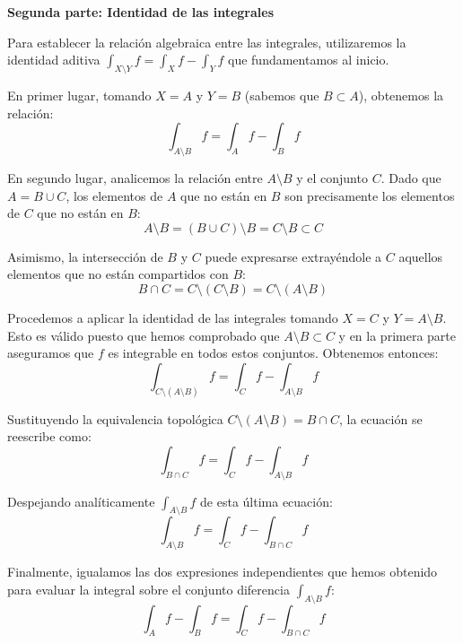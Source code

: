 \documentclass[11pt,letterpaper]{article}
\begin{document}
\vspace{0.5cm}
\textbf{Segunda parte: Identidad de las integrales}

Para establecer la relación algebraica entre las integrales, utilizaremos la identidad aditiva $\int_{X \setminus Y} f = \int_X f - \int_Y f$ que fundamentamos al inicio.

En primer lugar, tomando $X = A$ y $Y = B$ (sabemos que $B \subset A$), obtenemos la relación:
\begin{equation*}
\int_{A \setminus B} f = \int_A f - \int_B f
\end{equation*}

En segundo lugar, analicemos la relación entre $A \setminus B$ y el conjunto $C$. Dado que $A = B \cup C$, los elementos de $A$ que no están en $B$ son precisamente los elementos de $C$ que no están en $B$:
\begin{equation*}
A \setminus B = (B \cup C) \setminus B = C \setminus B \subset C
\end{equation*}

Asimismo, la intersección de $B$ y $C$ puede expresarse extrayéndole a $C$ aquellos elementos que no están compartidos con $B$:
\begin{equation*}
B \cap C = C \setminus (C \setminus B) = C \setminus (A \setminus B)
\end{equation*}

Procedemos a aplicar la identidad de las integrales tomando $X = C$ y $Y = A \setminus B$. Esto es válido puesto que hemos comprobado que $A \setminus B \subset C$ y en la primera parte aseguramos que $f$ es integrable en todos estos conjuntos. Obtenemos entonces:
\begin{equation*}
\int_{C \setminus (A \setminus B)} f = \int_C f - \int_{A \setminus B} f
\end{equation*}

Sustituyendo la equivalencia topológica $C \setminus (A \setminus B) = B \cap C$, la ecuación se reescribe como:
\begin{equation*}
\int_{B \cap C} f = \int_C f - \int_{A \setminus B} f
\end{equation*}

Despejando analíticamente $\int_{A \setminus B} f$ de esta última ecuación:
\begin{equation*}
\int_{A \setminus B} f = \int_C f - \int_{B \cap C} f
\end{equation*}

Finalmente, igualamos las dos expresiones independientes que hemos obtenido para evaluar la integral sobre el conjunto diferencia $\int_{A \setminus B} f$:
\begin{equation*}
\int_A f - \int_B f = \int_C f - \int_{B \cap C} f
\end{equation*}
\end{document}
